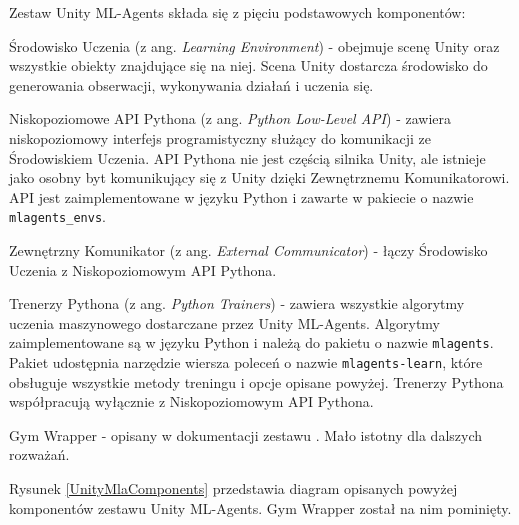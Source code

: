 Zestaw Unity ML-Agents składa się z pięciu podstawowych komponentów:
\begin{enumerate*}
\item Środowisko Uczenia (z ang. \textit{Learning Environment}) - obejmuje scenę Unity oraz wszystkie obiekty znajdujące się na niej. Scena Unity dostarcza środowisko do generowania obserwacji, wykonywania działań i uczenia się.
\item Niskopoziomowe API Pythona (z ang. \textit{Python Low-Level API}) \cite{unitymla:pythonapi} - zawiera niskopoziomowy interfejs programistyczny służący do komunikacji ze Środowiskiem Uczenia. API Pythona nie jest częścią silnika Unity, ale istnieje jako osobny byt komunikujący się z Unity dzięki Zewnętrznemu Komunikatorowi. API jest zaimplementowane w języku Python i zawarte w pakiecie o nazwie \texttt{mlagents\_envs}.
\item Zewnętrzny Komunikator (z ang. \textit{External Communicator}) - łączy Środowisko Uczenia z Niskopoziomowym API Pythona.
\item Trenerzy Pythona (z ang. \textit{Python Trainers}) - zawiera wszystkie algorytmy uczenia maszynowego dostarczane przez Unity ML-Agents. Algorytmy zaimplementowane są w języku Python i należą do pakietu o nazwie \texttt{mlagents}. Pakiet udostępnia narzędzie wiersza poleceń o nazwie \texttt{mlagents-learn}, które obsługuje wszystkie metody treningu i opcje opisane powyżej. Trenerzy Pythona współpracują wyłącznie z Niskopoziomowym API Pythona.
\item Gym Wrapper - opisany w dokumentacji zestawu \cite{unitymla:gymWrapper}. Mało istotny dla dalszych rozważań.
\end{enumerate*}

Rysunek \ref{UnityMlaComponents} przedstawia diagram opisanych powyżej komponentów zestawu Unity ML-Agents. Gym Wrapper został na nim pominięty.

